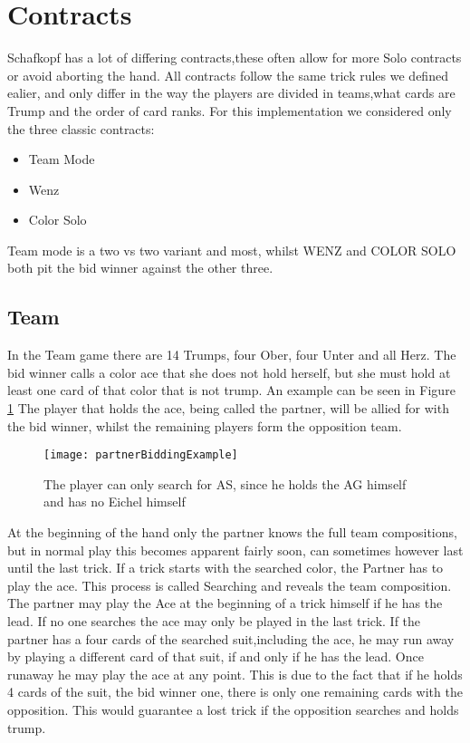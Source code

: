 \section{Contracts}
Schafkopf has a lot of differing contracts,these often allow for more Solo contracts or avoid aborting the hand.
All contracts follow the same trick rules we defined ealier, and only differ in the way the players are divided in
teams,what cards are Trump and the order of card ranks.
For this implementation we considered only the three classic contracts:
\begin{itemize}
    \item Team Mode
    \item Wenz
    \item Color Solo
\end{itemize}
Team mode is a two vs two variant and most, whilst WENZ and COLOR SOLO both pit the bid winner against the other three.

\subsection{Team}
In the Team game there are 14 Trumps, four Ober, four Unter and all Herz.
\newline
The bid winner calls a color ace that she does not hold herself, but she must hold at least one card of that color
that is not trump. An example can be seen in Figure \ref{fig:bidding}
The player that holds the ace, being called the partner, will be allied for with the bid winner, whilst the remaining
players form the opposition team.
\newline
\begin{figure}[h!]
    \texttt{[image: partnerBiddingExample]}\label{fig:figure}
    \caption{The player can only search for AS, since he holds the AG himself and has no Eichel himself}
    \label{fig:bidding}
\end{figure}
\newline
At the beginning of the hand only the partner knows the full team compositions, but in normal play this becomes
apparent fairly soon, can sometimes however last until the last trick.
If a trick starts with the searched color, the Partner has to play the ace.
This process is called Searching and reveals the team composition.
\newline
The partner may play the Ace at the beginning of a trick himself if he has the lead.
If no one searches the ace may only be played in the last trick.
If the partner has a four cards of the searched suit,including the ace, he may run away by playing a different card of
that suit, if and only if he has the lead.
Once runaway he may play the ace at any point.
This is due to the fact that if he holds 4 cards of the suit, the bid winner one, there is only one remaining cards
with the opposition.
This would guarantee a lost trick if the opposition searches and holds trump.

